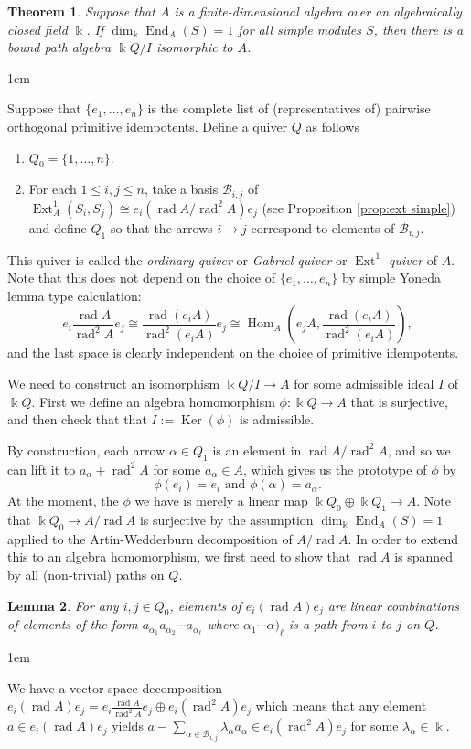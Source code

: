 \documentclass[11pt,a4paper]{article}
\makeatletter
\numberwithin{equation}{section}
\renewenvironment{proof}[1][\proofname]{\par
    \pushQED{\qed}%
    \normalfont \topsep0\p@\@plus6\p@ \labelsep1em\relax
    \trivlist
    \item[\hskip\labelsep\indent
        \bfseries #1]\ignorespaces
    \mbox{}
}{
    \popQED\endtrivlist\@endpefalse
}
\theoremstyle{all}
\newtheorem{theorem}{Theorem}[section]
\newtheorem{lemma}[theorem]{Lemma}
\theoremstyle{remark}
\newcommand{\rad}{\operatorname{rad}\nolimits}
\newcommand{\Ext}{\operatorname{Ext}\nolimits}
\newcommand{\Hom}{\operatorname{Hom}\nolimits}
\newcommand{\End}{\operatorname{End}\nolimits}
\newcommand{\Ker}{\operatorname{Ker}\nolimits}
\newcommand{\defn}[1]{\textsl{\color{darkblue} #1}}
\makeatother
\begin{document}
\begin{theorem}\label{thm:elementary algebra are bdd path alg}
Suppose that $A$ is a finite-dimensional algebra over an algebraically closed field $\Bbbk$.
If $\dim_{\Bbbk} \End_A(S)=1$ for all simple modules $S$, then there is a bound path algebra $\Bbbk Q/I$ isomorphic to $A$.
\end{theorem}
\begin{proof}
Suppose that $\{e_1,\ldots, e_n\}$ is the complete list of (representatives of) pairwise orthogonal primitive idempotents. 
Define a quiver $Q$ as follows
\begin{enumerate}
\item $Q_0 = \{ 1,\ldots, n\}$.
\item For each $1\le i,j\le n$, take a basis $\mathcal{B}_{i,j}$ of $\Ext_{A}^1(S_i,S_j) \cong e_i (\rad A/\rad^2 A) e_j$ (see Proposition \ref{prop:ext simple}) and define $Q_1$ so that the arrows $i\to j$ correspond to elements of $\mathcal{B}_{i,j}$.
\end{enumerate}
This quiver is called the \defn{ordinary quiver} or \defn{Gabriel quiver} or \defn{$\Ext^1$-quiver} of $A$.  Note that this does not depend on the choice of $\{ e_1, \ldots, e_n\}$ by simple Yoneda lemma type calculation:
\[
e_i\frac{\rad A}{\rad^2 A}e_j \cong \frac{\rad (e_i A)}{\rad^2(e_i A)}e_j \cong \Hom_A\left(e_j A, \frac{\rad (e_i A)}{\rad^2(e_i A)}\right),
\]
and the last space is clearly independent on the choice of primitive idempotents.

We need to construct an isomorphism $\Bbbk Q/I \to A$ for some admissible ideal $I$ of $\Bbbk Q$.
First we define an algebra homomorphism $\phi: \Bbbk Q\to A$ that is surjective, and then check that that $I:=\Ker(\phi)$ is admissible.  

By construction, each arrow $\alpha\in Q_1$ is an element in $\rad A/\rad^2 A$, and so we can lift it to $a_\alpha + \rad^2 A$ for some $a_\alpha\in A$, which gives us the prototype of $\phi$ by
\[
\phi(e_i) = e_i \text{ and }  \phi(\alpha) = a_\alpha.
\]
At the moment, the $\phi$ we have is merely a linear map $\Bbbk Q_0\oplus \Bbbk Q_1 \to A$.
Note that $\Bbbk Q_0\to A/\rad A$ is surjective by the assumption  $\dim_{\Bbbk}\End_A(S)=1$ applied to the Artin-Wedderburn decomposition of $A/\rad A$.
In order to extend this to an algebra homomorphism, we first need to show that $\rad A$ is spanned by all (non-trivial) paths on $Q$.
\begin{lemma}
For any $i,j\in Q_0$, elements of $e_i (\rad A) e_j$ are linear combinations of elements of the form $a_{\alpha_1}a_{\alpha_2}\cdots a_{\alpha_\ell}$ where $\alpha_1\cdots \alpha)_\ell$ is a path from $i$ to $j$ on $Q$.
\end{lemma}
\begin{proof}
We have a vector space decomposition $e_i (\rad A) e_j = e_i \frac{\rad A}{\rad^2 A} e_j \oplus e_i(\rad^2 A)e_j$ which means that any element $a\in e_i (\rad A)e_j$ yields $a - \sum_{\alpha \in \mathcal{B}_{i,j} } \lambda_\alpha a_\alpha \in e_i(\rad^2 A)e_j$ for some $\lambda_\alpha\in \Bbbk$.


\end{proof}
\end{proof}
\end{document}
